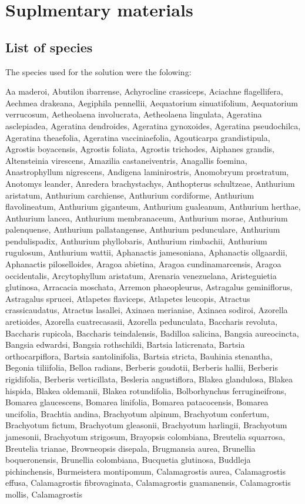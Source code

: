 \documentclass[]{article}
\begin{document}
\hypertarget{suplmentary-materials}{%
\section{Suplmentary materials}\label{suplmentary-materials}}

\hypertarget{list-of-species}{%
\subsection{List of species}\label{list-of-species}}

The species used for the solution were the folowing:

Aa maderoi, Abutilon ibarrense, Achyrocline crassiceps, Aciachne flagellifera, Aechmea drakeana, Aegiphila pennellii, Aequatorium sinuatifolium, Aequatorium verrucosum, Aetheolaena involucrata, Aetheolaena lingulata, Ageratina asclepiadea, Ageratina dendroides, Ageratina gynoxoides, Ageratina pseudochilca, Ageratina theaefolia, Ageratina vacciniaefolia, Agouticarpa grandistipula, Agrostis boyacensis, Agrostis foliata, Agrostis trichodes, Aiphanes grandis, Altensteinia virescens, Amazilia castaneiventris, Anagallis foemina, Anastrophyllum nigrescens, Andigena laminirostris, Anomobryum prostratum, Anotomys leander, Anredera brachystachys, Anthopterus schultzeae, Anthurium aristatum, Anthurium carchiense, Anthurium cordiforme, Anthurium flavolineatum, Anthurium giganteum, Anthurium gualeanum, Anthurium herthae, Anthurium lancea, Anthurium membranaceum, Anthurium morae, Anthurium palenquense, Anthurium pallatangense, Anthurium pedunculare, Anthurium pendulispadix, Anthurium phyllobaris, Anthurium rimbachii, Anthurium rugulosum, Anthurium wattii, Aphanactis jamesoniana, Aphanactis ollgaardii, Aphanactis piloselloides, Aragoa abietina, Aragoa cundinamarcensis, Aragoa occidentalis, Arcytophyllum aristatum, Arenaria venezuelana, Aristeguietia glutinosa, Arracacia moschata, Arremon phaeopleurus, Astragalus geminiflorus, Astragalus sprucei, Atlapetes flaviceps, Atlapetes leucopis, Atractus crassicaudatus, Atractus lasallei, Axinaea merianiae, Axinaea sodiroi, Azorella aretioides, Azorella cuatrecasasii, Azorella pedunculata, Baccharis revoluta, Baccharis rupicola, Baccharis teindalensis, Badilloa salicina, Bangsia aureocincta, Bangsia edwardsi, Bangsia rothschildi, Bartsia laticrenata, Bartsia orthocarpiflora, Bartsia santolinifolia, Bartsia stricta, Bauhinia stenantha, Begonia tiliifolia, Belloa radians, Berberis goudotii, Berberis hallii, Berberis rigidifolia, Berberis verticillata, Besleria angustiflora, Blakea glandulosa, Blakea hispida, Blakea oldemanii, Blakea rotundifolia, Bolborhynchus ferrugineifrons, Bomarea glaucescens, Bomarea linifolia, Bomarea patacocensis, Bomarea uncifolia, Brachtia andina, Brachyotum alpinum, Brachyotum confertum, Brachyotum fictum, Brachyotum gleasonii, Brachyotum harlingii, Brachyotum jamesonii, Brachyotum strigosum, Brayopsis colombiana, Breutelia squarrosa, Breutelia trianae, Browneopsis disepala, Brugmansia aurea, Brunellia boqueronensis, Brunellia colombiana, Bucquetia glutinosa, Buddleja pichinchensis, Burmeistera montipomum, Calamagrostis aurea, Calamagrostis effusa, Calamagrostis fibrovaginata, Calamagrostis guamanensis, Calamagrostis mollis, Calamagrostis 
\end{document}
